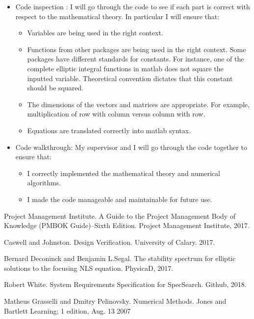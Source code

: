 \documentclass[12pt, titlepage]{article}
\begin{document}
\begin{itemize}
	\item Code inspection : I will 
	go through the code to see if each part is correct with respect to the
	mathematical theory. In particular I will ensure that: 
	\begin{itemize}
		\item Variables are being used in the right context. 
		\item Functions from other packages are being used in the right 
		context. Some packages have different standards for 
		constants. For instance, one of the complete elliptic integral 
		functions in matlab does not square the inputted variable. Theoretical 
		convention dictates that this constant should be squared. 
		\item The dimensions of the vectors and matrices are appropriate. For 
		example, multiplication of row with column versus column with row.
		\item Equations are translated correctly into matlab syntax.  
	\end{itemize} 
	\item Code walkthrough: My supervisor and I will go through the code 
	together to ensure that: 
	\begin{itemize}
		\item I correctly implemented the mathematical theory and numerical 
		algorithms.
		\item I made the code manageable and maintainable for future use.
	\end{itemize}
\end{itemize}
				


\newpage 
\begin{thebibliography}{9} 
	Project Management Institute. 
	A Guide to the Project Management Body of Knowledge (PMBOK Guide)–Sixth 
	Edition. 
	Project Management Institute, 2017. 
	
	Caswell and Johnston. 
	Design Verification. 
	University of Calary. 2017. 
	
	Bernard Deconinck and Benjamin L.Segal. 
	The stability spectrum for elliptic solutions to the focusing NLS equation. 
	PhysicaD, 2017. 
	 
	Robert White. 
	System Requirements Specification for SpecSearch. 
	Github, 2018. 
	
	Matheus Grasselli and Dmitry Pelinovsky. 
	Numerical Methods. 
	Jones and Bartlett Learning; 1 edition, Aug. 13 2007
	
\end{thebibliography} 
\end{document}
